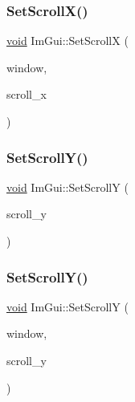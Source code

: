 \mbox{\label{namespaceImGui_a07804fd7663a2358ba4a8f58fd5f8ebc}} 
\subsubsection{\texorpdfstring{Set\+Scroll\+X()}{SetScrollX()}\hspace{0.1cm}{\footnotesize\ttfamily [2/2]}}
{\footnotesize\ttfamily \hyperlink{imgui__impl__opengl3__loader_8h_ac668e7cffd9e2e9cfee428b9b2f34fa7}{void} Im\+Gui\+::\+Set\+ScrollX (\begin{DoxyParamCaption}\item[{\hyperlink{structImGuiWindow}{Im\+Gui\+Window} $\ast$}]{window,  }\item[{float}]{scroll\+\_\+x }\end{DoxyParamCaption})}

\mbox{\label{namespaceImGui_a41833555962807384432e6fc94d46ec9}} 
\subsubsection{\texorpdfstring{Set\+Scroll\+Y()}{SetScrollY()}\hspace{0.1cm}{\footnotesize\ttfamily [1/2]}}
{\footnotesize\ttfamily \hyperlink{imgui__impl__opengl3__loader_8h_ac668e7cffd9e2e9cfee428b9b2f34fa7}{void} Im\+Gui\+::\+Set\+ScrollY (\begin{DoxyParamCaption}\item[{float}]{scroll\+\_\+y }\end{DoxyParamCaption})}

\mbox{\label{namespaceImGui_a784db31a3a0808cb730fd50d4610b2f3}} 
\subsubsection{\texorpdfstring{Set\+Scroll\+Y()}{SetScrollY()}\hspace{0.1cm}{\footnotesize\ttfamily [2/2]}}
{\footnotesize\ttfamily \hyperlink{imgui__impl__opengl3__loader_8h_ac668e7cffd9e2e9cfee428b9b2f34fa7}{void} Im\+Gui\+::\+Set\+ScrollY (\begin{DoxyParamCaption}\item[{\hyperlink{structImGuiWindow}{Im\+Gui\+Window} $\ast$}]{window,  }\item[{float}]{scroll\+\_\+y }\end{DoxyParamCaption})}

